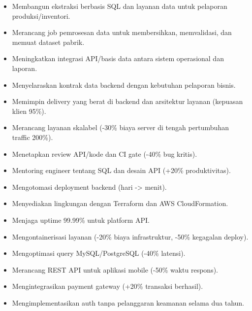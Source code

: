 
\begin{itemize}
\item Membangun ekstraksi berbasis SQL dan layanan data untuk pelaporan produksi/inventori.
\item Merancang job pemrosesan data untuk membersihkan, memvalidasi, dan memuat dataset pabrik.
\item Meningkatkan integrasi API/basis data antara sistem operasional dan laporan.
\item Menyelaraskan kontrak data backend dengan kebutuhan pelaporan bisnis.
\end{itemize}
\divider

\begin{itemize}
\item Memimpin delivery yang berat di backend dan arsitektur layanan (kepuasan klien 95\%).
\item Merancang layanan skalabel (-30\% biaya server di tengah pertumbuhan traffic 200\%).
\item Menetapkan review API/kode dan CI gate (-40\% bug kritis).
\item Mentoring engineer tentang SQL dan desain API (+20\% produktivitas).
\end{itemize}
\divider

\begin{itemize}
\item Mengotomasi deployment backend (hari -> menit).
\item Menyediakan lingkungan dengan Terraform dan AWS CloudFormation.
\item Menjaga uptime 99.99\% untuk platform API.
\item Mengontainerisasi layanan (-20\% biaya infrastruktur, -50\% kegagalan deploy).
\end{itemize}
\divider

\begin{itemize}
\item Mengoptimasi query MySQL/PostgreSQL (-40\% latensi).
\item Merancang REST API untuk aplikasi mobile (-50\% waktu respons).
\item Mengintegrasikan payment gateway (+20\% transaksi berhasil).
\item Mengimplementasikan auth tanpa pelanggaran keamanan selama dua tahun.
\end{itemize}
\divider

